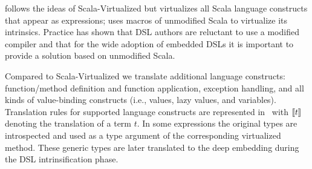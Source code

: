  \yy follows the ideas of Scala-Virtualized but virtualizes all Scala language constructs that
  appear as expressions; uses macros of unmodified Scala to virtualize its intrinsics.
  Practice has shown that DSL authors are reluctant to use a modified compiler and that for the wide adoption
  of embedded DSLs it is important to provide a solution based on unmodified Scala.

 Compared to Scala-Virtualized we translate additional language constructs:
  function/method definition and function application, exception handling, and all kinds of value-binding constructs
  (i.e., values, lazy values, and variables). Translation rules for supported language constructs are
  represented in~ with $\llbracket t \rrbracket$ denoting the translation of a term $t$. In some expressions
  the original types are introspected and used as a type argument of the corresponding virtualized method. These
  generic types are later translated to the deep embedding during the DSL intrinsification phase.

